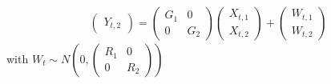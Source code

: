 \documentclass{article}
\begin{document}
{\begin{align*}
\begin{pmatrix}
    Y_{t,2}
  \end{pmatrix} = 
  \begin{pmatrix}
    G_1 & 0 \\
    0 & G_2
  \end{pmatrix} 
  \begin{pmatrix}
    X_{t,1} \\
    X_{t,2}
  \end{pmatrix} + 
  \begin{pmatrix}
    W_{t,1} \\ 
    W_{t,2}
  \end{pmatrix}
\end{align*}
with \(W_t \sim N(0, \begin{pmatrix}
  R_1 & 0 \\
  0 & R_2
\end{pmatrix})\)

}
\end{document}
